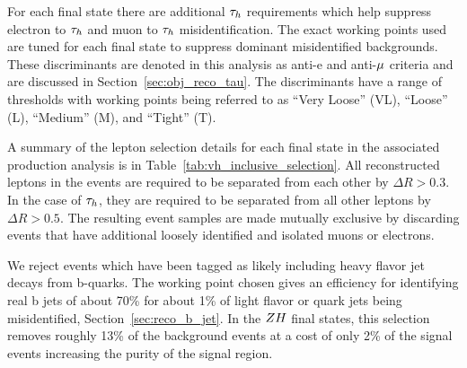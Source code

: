 For each final state there are additional $\tau_{h}$ requirements
which help suppress electron to $\tau_{h}$ and muon to $\tau_{h}$ misidentification.
The exact working points used are tuned for each final state to suppress dominant
misidentified backgrounds. These discriminants are denoted in this analysis as
anti-e and anti-$\mu$ criteria and are discussed in Section~\ref{sec:obj_reco_tau}.
The discriminants have a range of thresholds with working points being
referred to as ``Very Loose'' (VL), ``Loose'' (L), ``Medium'' (M), and ``Tight'' (T).

A summary of the lepton selection details for each final state in the associated
production analysis is in Table~\ref{tab:vh_inclusive_selection}.
All reconstructed leptons in the events are required to be separated from each 
other by $\Delta R > 0.3$. In the case of $\tau_{h}$, they are required to be 
separated from all other leptons by $\Delta R > 0.5$. The resulting event samples are made mutually 
exclusive by discarding events that have additional loosely identified 
and isolated muons or electrons.

We reject events which have been tagged as likely including heavy flavor jet decays from b-quarks.
The working point chosen gives an efficiency for identifying real b jets of about 70\% for 
about 1\% of light flavor or quark jets being misidentified, Section~\ref{sec:reco_b_jet}.
In the $ZH$ final states, this selection removes roughly 13\% of the background events
at a cost of only 2\% of the signal events increasing the purity of the signal region.

